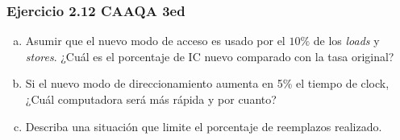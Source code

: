 \documentclass{beamer}
\begin{document}
\begin{frame}[fragile]
 \frametitle{Ejercicio 2.12 CAAQA 3ed}
\begin{enumerate}[a.]
 \item Asumir que el nuevo modo de acceso es usado por el $10\%$ de los \textit{loads} y \textit{stores}. ¿Cuál es el porcentaje de IC nuevo comparado con la tasa original?
\item Si el nuevo modo de direccionamiento aumenta en 5\% el tiempo de clock, ¿Cuál computadora será más rápida y por cuanto?
\item Describa una situación que limite el porcentaje de reemplazos realizado.

\end{enumerate}

\end{frame}
\end{document}
